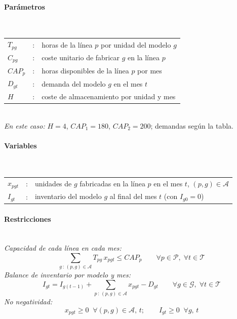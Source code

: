 \paragraph{Parámetros}\mbox{}\\
\begin{tabular}{l c l}
    $T_{pg}$   & : & horas de la línea $p$ por unidad del modelo $g$ \\
    $C_{pg}$   & : & coste unitario de fabricar $g$ en la línea $p$ \\
    $CAP_p$    & : & horas disponibles de la línea $p$ por mes \\
    $D_{gt}$   & : & demanda del modelo $g$ en el mes $t$ \\
    $H$        & : & coste de almacenamiento por unidad y mes \\
\end{tabular}
\\[2pt]
\textit{En este caso: } $H=4$, $CAP_1=180$, $CAP_2=200$; demandas según la tabla.

\paragraph{Variables}\mbox{}\\
\begin{tabular}{l c l}
    $x_{pgt}$ & : & unidades de $g$ fabricadas en la línea $p$ en el mes $t$, \; $(p,g)\in\mathcal{A}$ \\
    $I_{gt}$    & : & inventario del modelo $g$ al final del mes $t$ (con $I_{g0}=0$) \\
\end{tabular}

\paragraph{Restricciones}\mbox{}\\
\emph{Capacidad de cada línea en cada mes:}
\begin{equation}
    \sum_{g\,:\,(p,g)\in\mathcal{A}} T_{pg}\, x_{pgt} \leq CAP_p \qquad \forall p \in \mathcal{P},\; \forall t \in \mathcal{T}
\end{equation}
\emph{Balance de inventario por modelo y mes:}
\begin{equation}
    I_{gt} = I_{g(t-1)} + \sum_{p\,:\,(p,g)\in\mathcal{A}} x_{pgt} - D_{gt} \qquad \forall g \in \mathcal{G},\; \forall t \in \mathcal{T}
\end{equation}
\emph{No negatividad:}
\begin{equation}
    x_{pgt} \geq 0 \;\; \forall (p,g)\in\mathcal{A},\, t; \qquad I_{gt} \geq 0 \;\; \forall g,\, t
\end{equation}

